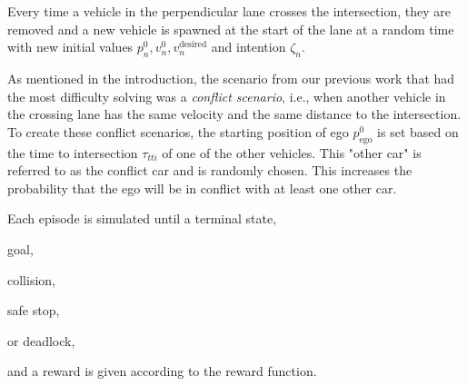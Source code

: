 Every time a vehicle in the perpendicular lane crosses the intersection, they are removed and a new vehicle is spawned at the start of the lane at a random time with new initial values $p_n^0, v_n^0, v^\mathrm{desired}_n$ and intention $\zeta_n$. 

As mentioned in the introduction, the scenario from our previous work \cite{tram2019} that had the most difficulty solving was a \textit{conflict scenario}, i.e., when another vehicle in the crossing lane has the same velocity and the same distance to the intersection. To create these conflict scenarios, the starting position of ego $p^0_\mathrm{ego}$ is set based on the time to intersection $\tau_{tti}$ of one of the other vehicles.
This "other car" is referred to as the conflict car and is randomly chosen. 
This increases the probability that the ego will be in conflict with at least one other car. 

Each episode is simulated until a terminal state, 
\begin{enumerate*}[label=(\roman*)]
  \item goal,
  \item collision, 
  \item safe stop, 
  \item or deadlock, 
\end{enumerate*} and a reward is given according to the reward function.

%         

